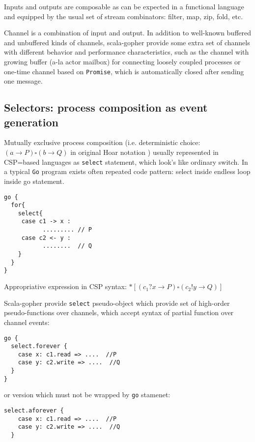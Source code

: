 \documentclass[12pt]{article}
\begin{document}
  Inputs and outputs are composable as can be expected in a functional language and equipped by 
the usual set of stream combinators: filter, map, zip, fold, etc.
 
  Channel is a combination of input and output. In addition to well-known buffered and unbuffered 
kinds of channels, scala-gopher provide some extra set of channels with different behavior and performance characteristics,
 such as the channel with growing buffer (a-la actor mailbox) for connecting loosely coupled processes or one-time channel based on \verb|Promise|, which is automatically closed after sending one message.

\subsection{Selectors: process composition as event generation}

 Mutually exclusive process composition (i.e. deterministic choice: $(a \to P)\square(b\to Q)$ in original Hoar notation )  usually represented in CSP=based languages as \verb|select| statement, which look's like ordinary switch. In a typical \verb|Go| program exists often repeated code pattern: select inside endless loop inside go statement.

\begin{Verbatim}[fontsize=\small]
go {
  for{
    select{
     case c1 -> x :
           ......... // P
     case c2 <- y :
           ........  // Q
    }
  }
}
\end{Verbatim}

  Appropriative expression in CSP syntax: $*[(c_{1} ? x \to P)\square(c_{2} ! y \to Q)]$

 Scala-gopher provide \verb|select| pseudo-object which provide set of high-order pseudo-functions over
channels, which accept syntax of partial function over channel events:

\begin{Verbatim}[fontsize=\small]
go {   
  select.forever {
    case x: c1.read => ....  //P
    case y: c2.write => ....  //Q
  }
}
\end{Verbatim}
   
  or version which must not be wrapped by \verb|go| stamenet:

\begin{Verbatim}[fontsize=\small]
  select.aforever {
    case x: c1.read => ....  //P
    case y: c2.write => ....  //Q
  }
\end{Verbatim}
   
\end{document}
